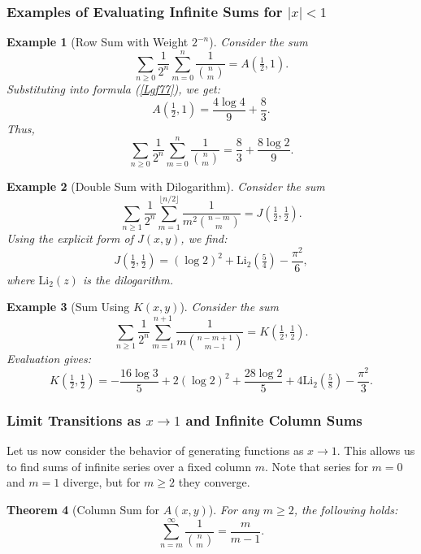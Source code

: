 \documentclass[12pt]{article}
\newcommand{\Li}{\mathrm{Li}_2} %
\newtheorem{theorem}{Theorem}[section]
\newtheorem{example}[theorem]{Example}
\begin{document}
\subsubsection{Examples of Evaluating Infinite Sums for \( |x| < 1 \)}

\begin{example}[Row Sum with Weight \( 2^{-n} \)]
Consider the sum
\[
\sum_{n \geq 0} \frac{1}{2^n} \sum_{m=0}^n \frac{1}{\binom{n}{m}} = A\!\left(\tfrac12, 1\right).
\]
Substituting into formula (\ref{Lgf77}), we get:
\[
A\!\left(\tfrac12, 1\right) = \frac{4 \log 4}{9} + \frac{8}{3}.
\]
Thus,
\[
\sum_{n \geq 0} \frac{1}{2^n} \sum_{m=0}^n \frac{1}{\binom{n}{m}} = \frac{8}{3} + \frac{8 \log 2}{9}.
\]
\end{example}

\begin{example}[Double Sum with Dilogarithm]
Consider the sum
\[
\sum_{n \geq 1} \frac{1}{2^n} \sum_{m=1}^{\lfloor n/2 \rfloor} \frac{1}{m^2 \binom{n-m}{m}} = J\!\left(\tfrac12, \tfrac12\right).
\]
Using the explicit form of \( J(x,y) \), we find:
\[
J\!\left(\tfrac12, \tfrac12\right) = (\log 2)^2 + \mathrm{Li}_2 \!\left(\tfrac54\right) - \frac{\pi^2}{6},
\]
where \( \mathrm{Li}_2 (z) \) is the dilogarithm.
\end{example}

\begin{example}[Sum Using \( K(x,y) \)]
Consider the sum
\[
\sum_{n \geq 1} \frac{1}{2^n} \sum_{m=1}^{n+1} \frac{1}{m \binom{n-m+1}{m-1}} = K\!\left(\tfrac12, \tfrac12\right).
\]
Evaluation gives:
\[
K\!\left(\tfrac12, \tfrac12\right) = -\frac{16 \log 3}{5} + 2(\log 2)^2 + \frac{28 \log 2}{5} + 4 \Li\!\left(\tfrac58\right) - \frac{\pi^2}{3}.
\]
\end{example}

\subsubsection{Limit Transitions as \( x \to 1 \) and Infinite Column Sums}

Let us now consider the behavior of generating functions as \( x \to 1 \). This allows us to find sums of infinite series over a fixed column \( m \). Note that series for \( m = 0 \) and \( m = 1 \) diverge, but for \( m \geq 2 \) they converge.

\begin{theorem}[Column Sum for \( A(x,y) \)]
For any \( m \geq 2 \), the following holds:
\begin{equation}\label{inf-col-A}
\sum_{n=m}^{\infty} \frac{1}{\binom{n}{m}} = \frac{m}{m-1}.
\end{equation}
\end{theorem}
\end{document}
